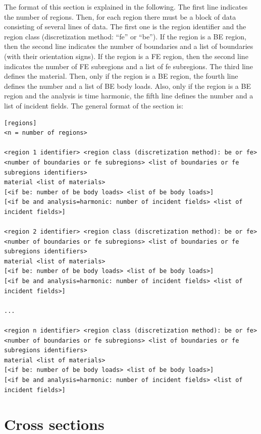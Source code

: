 \documentclass[a4paper,fleqn]{book}
\begin{document}
The format of this section is explained in the following. The first line indicates the number of regions. Then, for each region there must be a block of data consisting of several lines of data. The first one is the region identifier and the region class (discretization method: ``fe'' or ``be''). If the region is a BE region, then the second line indicates the number of boundaries and a list of boundaries (with their orientation signs). If the region is a FE region, then the second line indicates the number of FE subregions and a list of fe subregions. The third line defines the material. Then, only if the region is a BE region, the fourth line defines the number and a list of BE body loads. Also, only if the region is a BE region and the analysis is time harmonic, the fifth line defines the number and a list of incident fields. The general format of the section is:
\begin{Verbatim}[frame=single, fontsize=\small, label={general format of section [regions]}]
[regions]
<n = number of regions>

<region 1 identifier> <region class (discretization method): be or fe> 
<number of boundaries or fe subregions> <list of boundaries or fe subregions identifiers>
material <list of materials>
[<if be: number of be body loads> <list of be body loads>]
[<if be and analysis=harmonic: number of incident fields> <list of incident fields>]

<region 2 identifier> <region class (discretization method): be or fe> 
<number of boundaries or fe subregions> <list of boundaries or fe subregions identifiers>
material <list of materials>
[<if be: number of be body loads> <list of be body loads>]
[<if be and analysis=harmonic: number of incident fields> <list of incident fields>]

...

<region n identifier> <region class (discretization method): be or fe> 
<number of boundaries or fe subregions> <list of boundaries or fe subregions identifiers>
material <list of materials>
[<if be: number of be body loads> <list of be body loads>]
[<if be and analysis=harmonic: number of incident fields> <list of incident fields>]
\end{Verbatim} 





\section{Cross sections}
\end{document}
